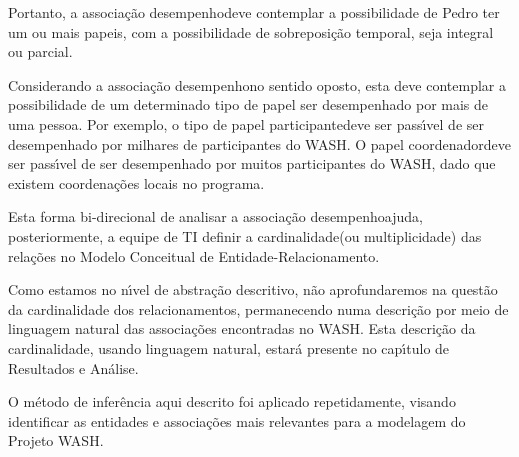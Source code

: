 \documentclass[
12pt,		%
openright,	%
twoside,  %
a4paper,			%
chapter=TITLE,		%
english,			%
french,				%
spanish,			%
brazil				%
]{USPSC-classe/USPSC}
\begin{document}
 Portanto, a associa\c{c}\~ao \textquotedbl desempenho\textquotedbl  deve contemplar a possibilidade de Pedro ter um ou mais papeis, com a possibilidade de sobreposi\c{c}\~ao temporal, seja integral ou parcial.














Considerando a associa\c{c}\~ao \textquotedbl desempenho\textquotedbl  no sentido oposto, esta deve contemplar a possibilidade de um determinado tipo de papel ser desempenhado por mais de uma pessoa. Por exemplo, o tipo de papel \textquotedbl participante\textquotedbl  deve ser pass\'{\i}vel de ser desempenhado por milhares de participantes do WASH. O papel \textquotedbl coordenador\textquotedbl  deve ser pass\'{\i}vel de ser desempenhado por muitos participantes do WASH, dado que existem coordena\c{c}\~oes locais no programa.














Esta forma bi-direcional de analisar a associa\c{c}\~ao \textquotedbl desempenho\textquotedbl  ajuda, posteriormente, a equipe de TI definir a \textquotedbl cardinalidade\textquotedbl  (ou multiplicidade) das rela\c{c}\~oes no Modelo Conceitual de Entidade-Relacionamento.














Como estamos no n\'{\i}vel de abstra\c{c}\~ao descritivo, n\~ao aprofundaremos na quest\~ao da cardinalidade dos relacionamentos, permanecendo numa descri\c{c}\~ao por meio de linguagem natural das associa\c{c}\~oes encontradas no WASH. Esta descri\c{c}\~ao da cardinalidade, usando linguagem natural, estar\'a presente no cap\'{\i}tulo de Resultados e An\'alise.














O m\'etodo de infer\^encia aqui descrito foi aplicado repetidamente, visando identificar as entidades e associa\c{c}\~oes mais relevantes para a modelagem do Projeto WASH.
\end{document}

